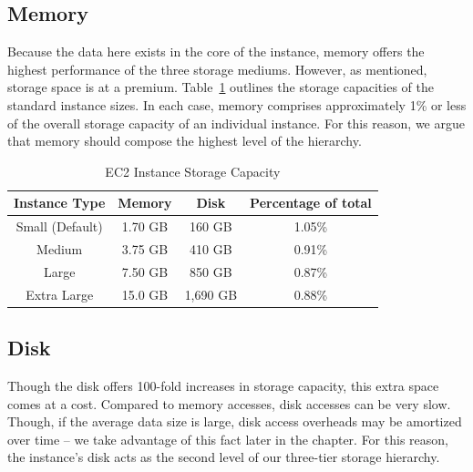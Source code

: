 \subsection{Memory} %
\label{sub:storage_memory}
Because the data here exists in the core of the instance, memory offers the
highest performance of the three storage mediums. However, as mentioned,
storage space is at a premium. Table~\ref{tab:mem_ec2_instance} outlines the
storage capacities of the standard instance sizes. In each case, memory
comprises approximately 1\% or less of the overall storage capacity of an
individual instance. For this reason, we argue that memory should compose the
highest level of the hierarchy.

\begin{table}[htp]
  \begin{center}
    \begin{tabular}{|c|c c| c|}
      \hline
      \multicolumn{1}{|c}{\textbf{Instance Type}} &
      \multicolumn{1}{|c}{\textbf{Memory}} &
			\multicolumn{1}{c|}{\textbf{Disk}} &
			\multicolumn{1}{c|}{\textbf{Percentage of total}}\\
      \hline
			Small (Default)     & 1.70 GB & 160 GB & 1.05\%\\
								   Medium & 3.75 GB & 410 GB & 0.91\%\\
						        Large & 7.50 GB & 850 GB & 0.87\%\\
				      Extra Large & 15.0 GB & 1,690 GB & 0.88\%\\
      \hline
    \end{tabular}
    \caption{EC2 Instance Storage Capacity}
    \label{tab:mem_ec2_instance}
  \end{center}
\end{table}


\subsection{Disk} %
\label{sub:storage_disk}
Though the disk offers 100-fold increases in storage capacity, this extra space
comes at a cost. Compared to memory accesses, disk accesses can be very slow.
Though, if the average data size is large, disk access overheads may be
amortized over time -- we take advantage of this fact later in the chapter.
For this reason, the instance's disk acts as the second level of our three-tier
storage hierarchy.


